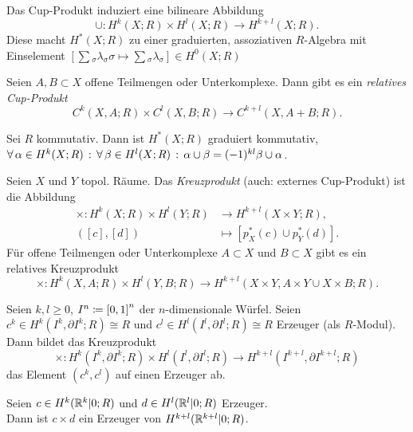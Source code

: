 \documentclass{cheat-sheet}
\begin{document}
\begin{kor}
  Das Cup-Produkt induziert eine bilineare Abbildung
  \[ \cup : H^k(X; R) \times H^l(X; R) \to H^{k+l}(X; R). \]
  Diese macht $H^*(X; R)$ zu einer graduierten, assoziativen $R$-Algebra mit Einselement $[\sum\!_\sigma \lambda_\sigma \sigma \mapsto \sum\!_\sigma \lambda_\sigma] \in H^0(X; R)$
\end{kor}

\begin{bem}
  Seien $A, B \subset X$ offene Teilmengen oder Unterkomplexe. Dann gibt es ein \emph{relatives Cup-Produkt}
  \[ C^k(X, A; R) \times C^l(X, B; R) \to C^{k+l}(X, A + B; R). \]
\end{bem}

\begin{satz}
  Sei $R$ kommutativ. Dann ist $H^*(X; R)$ graduiert kommutativ, \dh{}
  $\forall \, {\alpha \in H^k(X; R)} \,:\, \forall \, {\beta \in H^l(X; R)} \,:\, \alpha \cup \beta = (-1)^{kl} \beta \cup \alpha$.
\end{satz}

\begin{defn}
  Seien $X$ und $Y$ topol. Räume.
  Das \emph{Kreuzprodukt} (auch: externes Cup-Produkt) ist die Abbildung
  \begin{align*}
    \times : H^k(X; R) \times H^l(Y; R) & \to H^{k+l}(X \times Y; R), \\
    ([c], [d]) & \mapsto [p_X^*(c) \cup p_Y^*(d)].
  \end{align*}
  Für offene Teilmengen oder Unterkomplexe $A \subset X$ und $B \subset X$ gibt es ein relatives Kreuzprodukt
  \[ \times : H^k(X, A; R) \times H^l(Y, B; R) \to H^{k+l}(X \times Y, A \times Y \cup X \times B; R). \]
\end{defn}

\begin{satz}
  Seien $k, l \geq 0$, $I^n \coloneqq \left[ 0, 1 \right]^n$ der $n$-dimensionale Würfel. Seien $c^k \in H^k(I^k, \partial I^k; R) \cong R$ und $c^l \in H^l(I^l, \partial I^l; R) \cong R$ Erzeuger (als $R$-Modul). Dann bildet das Kreuzprodukt
  \[ \times : H^k(I^k, \partial I^k; R) \times H^l(I^l, \partial I^l; R) \to H^{k+l}(I^{k+l}, \partial I^{k+l}; R) \]
  das Element $(c^k, c^l)$ auf einen Erzeuger ab.
\end{satz}

\begin{satz}
  Seien $c \in H^k(\mathbb{R}^k|0; R)$ und $d \in H^l(\mathbb{R}^l|0; R)$ Erzeuger.\\
  Dann ist $c \times d$ ein Erzeuger von $H^{k+l}(\mathbb{R}^{k+l}|0; R)$.
\end{satz}
\end{document}
